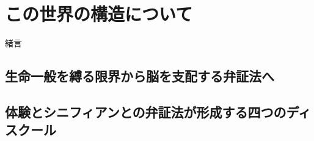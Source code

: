 





\frontmatter

\tableofcontents %

\mainmatter

\part{この世界の構造について}

{\Large 緒言\\}


\newpage


\newpage

\chapter{生命一般を縛る限界から脳を支配する弁証法へ}


\newpage



\newpage



\newpage


\chapter{体験とシニフィアンとの弁証法が形成する四つのディスクール}


\newpage



\newpage



\newpage



\newpage



\newpage


